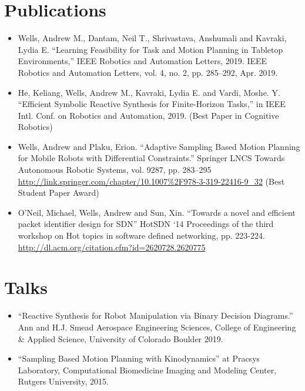 \documentclass[11pt,a4paper,sans]{moderncv}        %
\begin{document}
\section{Publications}

\vspace{6pt}

\begin{itemize}

\item{Wells, Andrew M., Dantam, Neil T., Shrivastava, Anshumali and Kavraki, Lydia E.  “Learning Feasibility for Task and Motion Planning in Tabletop Environments,” IEEE Robotics and Automation Letters, 2019. IEEE Robotics and Automation Letters, vol. 4, no. 2, pp. 285–292, Apr. 2019.}

\item{He, Keliang, Wells, Andrew M., Kavraki, Lydia E. and Vardi, Moshe. Y.  “Efficient Symbolic Reactive Synthesis for Finite-Horizon Tasks,” in IEEE Intl. Conf. on Robotics and Automation, 2019. (Best Paper in Cognitive Robotics)}

\item{Wells, Andrew and Plaku, Erion.  “Adaptive Sampling Based Motion Planning for Mobile Robots with Differential Constraints.” Springer LNCS Towards Autonomous Robotic Systems, vol. 9287, pp. 283–295 \url{http://link.springer.com/chapter/10.1007%2F978-3-319-22416-9_32} (Best Student Paper Award)}

\item{O’Neil, Michael, Wells, Andrew and Sun, Xin. “Towards a novel and efficient packet identifier design for SDN” HotSDN ‘14 Proceedings of the third workshop on Hot topics in software defined networking, pp. 223-224. \url{http://dl.acm.org/citation.cfm?id=2620728.2620775}}

\end{itemize}

\section{Talks}

\vspace{6pt}
 
\begin{itemize}

\item{“Reactive Synthesis for Robot Manipulation via Binary Decision Diagrams.” Ann and H.J. Smead Aerospace Engineering Sciences, College of Engineering \& Applied Science, University of Colorado Boulder 2019.}

\vspace{6pt}

\item{“Sampling Based Motion Planning with Kinodynamics” at Pracsys Laboratory, Computational Biomedicine Imaging and Modeling Center, Rutgers University, 2015.}

\end{itemize}
\end{document}

